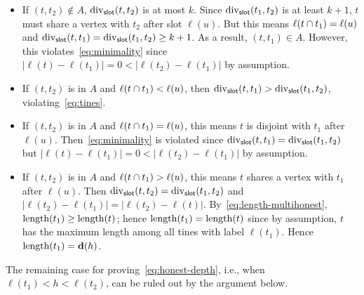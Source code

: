     \begin{itemize}

      \item If $(t, t_2) \not \in A$, 
      $\mathrm{div}_{\mathsf{slot}}(t, t_2)$ is at most $k$.
      Since $\mathrm{div}_{\mathsf{slot}}(t_1, t_2)$ is at least $k + 1$, 
      $t$ must share a vertex with $t_2$ after slot $\ell(u)$. 
      But this means $\ell(t \cap t_1) = \ell(u)$ 
      and $\mathrm{div}_{\mathsf{slot}}(t, t_1) = \mathrm{div}_{\mathsf{slot}}(t_1, t_2) \geq k + 1$. 
      As a result, $(t, t_1) \in A$. 
      However, this violates~\eqref{eq:minimality} 
      since $|\ell(t) - \ell(t_1)| = 0 < |\ell(t_2) - \ell(t_1)|$ by assumption. 

      \item 
      If $(t, t_2)$ is in $A$ and 
      $\ell(t \cap t_1) < \ell(u)$, 
      then $\mathrm{div}_{\mathsf{slot}}(t, t_1) > \mathrm{div}_{\mathsf{slot}}(t_1, t_2)$, 
      violating~\eqref{eq:tines}. 

      \item 
      If $(t, t_2)$ is in $A$ and 
      $\ell(t \cap t_1) = \ell(u)$, 
      this means $t$ is disjoint with $t_1$ after $\ell(u)$. 
      Then~\eqref{eq:minimality} is violated 
      since $\mathrm{div}_{\mathsf{slot}}(t, t_1) = \mathrm{div}_{\mathsf{slot}}(t_1, t_2)$ but 
      $|\ell(t) - \ell(t_1)| = 0 < |\ell(t_2) - \ell(t_1)|$ by assumption. 

      \item 
      If $(t, t_2)$ is in $A$ and 
      $\ell(t \cap t_1) > \ell(u)$, 
      this means $t$ shares a vertex with $t_1$ after $\ell(u)$. 
      Then $\mathrm{div}_{\mathsf{slot}}(t, t_2) = \mathrm{div}_{\mathsf{slot}}(t_1, t_2)$ 
      and $|\ell(t_2) - \ell(t_1)| = |\ell(t_2) - \ell(t)|$. 
      By~\eqref{eq:length-multihonest}, 
      $\operatorname{length}(t_1) \geq \operatorname{length}(t)$; 
      hence $\operatorname{length}(t_1) = \operatorname{length}(t)$ since by assumption, 
      $t$ has the maximum length among all tines with label $\ell(t_1)$. 
      Hence $\operatorname{length}(t_1) = \mathbf{d}(h)$.

    \end{itemize}
    The remaining case for proving~\eqref{eq:honest-depth}, 
    i.e., when $\ell(t_1) < h < \ell(t_2)$, 
    can be ruled out by the argument below.




